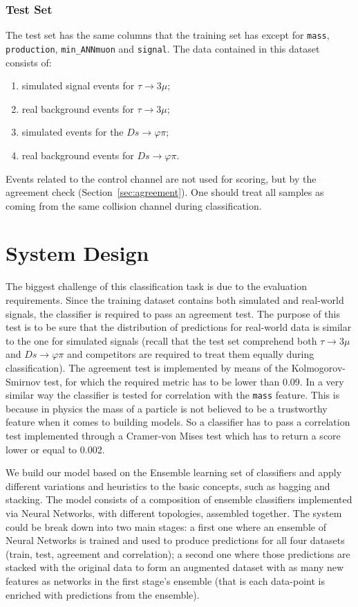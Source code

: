 \documentclass[conference]{IEEEtran}
\begin{document}
\subsubsection{Test Set}
\label{sec:test-set}
The test set has the same columns that the training set has except for
\texttt{mass}, \texttt{production}, \texttt{min\_ANNmuon} and \texttt{signal}.
The data contained in this dataset consists of:
\begin{enumerate}
	\item simulated signal events for $\tau \rightarrow 3\mu$;
	\item real background events for $\tau \rightarrow 3\mu$;
	\item simulated events for the $Ds \rightarrow \varphi\pi$;
	\item real background events for $Ds \rightarrow \varphi\pi$.
\end{enumerate}
Events related to the control channel are not used for scoring, but by the
agreement check (Section~\ref{sec:agreement}). One should treat all samples as
coming from the same collision channel during classification.

\section{System Design}
\label{sec:system_design}
The biggest challenge of this classification task is due to the evaluation
requirements. Since the training dataset contains both simulated and real-world
signals, the classifier is required to pass an agreement test. The purpose of
this test is to be sure that the distribution of predictions for real-world data
is similar to the one for simulated signals (recall that the test set comprehend
both $\tau \rightarrow 3\mu$ and $Ds \rightarrow \varphi\pi$ and competitors are
required to treat them equally during classification). The agreement test is
implemented by means of the Kolmogorov-Smirnov test, for which the required
metric has to be lower than 0.09. In a very similar way the classifier is
tested for correlation with the \texttt{mass} feature. This is because in physics the
mass of a particle is not believed to be a trustworthy feature when it comes to
building models. So a classifier has to pass a correlation test implemented
through a Cramer-von Mises test which has to return a score lower or equal to
0.002.

We build our model based on the Ensemble learning set of classifiers and apply
different variations and heuristics to the basic concepts, such as bagging and
stacking. The model consists of a composition of ensemble classifiers
implemented via Neural Networks, with different topologies,
assembled together. The system could be break down into two main stages: a first
one where an ensemble of Neural Networks is trained and used to produce
predictions for all four datasets (train, test, agreement and correlation); a
second one where those predictions are stacked with the original data to form an
augmented dataset with as many new features as networks in the first stage's
ensemble (that is each data-point is enriched with predictions from the
ensemble).
\end{document}
